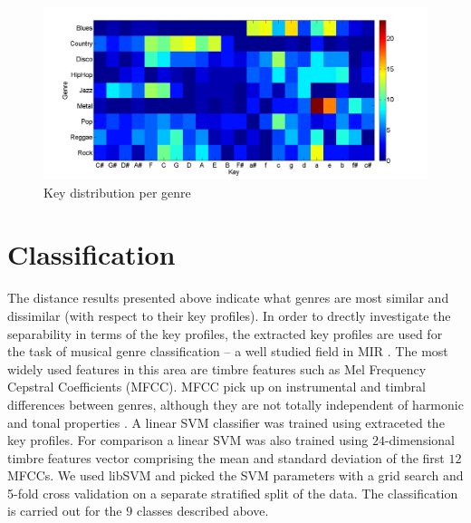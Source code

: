 \documentclass{article}
\begin{document}
\begin{figure}\setcounter{figure}{1}
    \includegraphics[scale=.2]{graph/key_distribution_colour_legend}
	\caption{Key distribution per genre}
	\label{fig:KeyDistributionPerGenre}
\end{figure}


\section{Classification}\label{sec:classification}
The distance results presented above indicate what genres are most similar and dissimilar (with respect to their key profiles). In order to drectly investigate the separability in terms of the key profiles, the extracted key profiles are used for the task of musical genre classification --  a well studied field in MIR \cite{fu_survey_2011}. The most widely used features in this area are timbre features such as Mel Frequency Cepstral Coefficients (MFCC). MFCC pick up on instrumental and timbral differences between genres, although they are not totally independent of harmonic and tonal properties \cite{li_genre_2011}.
A linear SVM classifier was trained using extraceted the key profiles. For comparison a linear SVM was also trained using $24$-dimensional timbre features vector comprising the mean and standard deviation of the first $12$ MFCCs. %
We used libSVM  \cite{chang_libsvm:_2011} and picked the SVM parameters with a grid search and 5-fold cross validation on a separate stratified split of the data. The classification is carried out for the $9$ classes described above.
\end{document}
